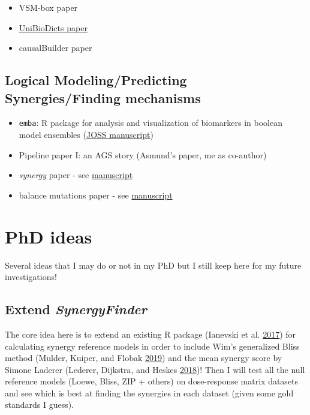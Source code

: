 \documentclass[
  12pt,
]{book}
\providecommand{\tightlist}{%
  \setlength{\itemsep}{0pt}\setlength{\parskip}{0pt}}
\begin{document}
\begin{itemize}
\tightlist
\item
  VSM-box paper
\item
  \protect\hyperlink{vsm}{UniBioDicts paper}
\item
  causalBuilder paper
\end{itemize}

\hypertarget{logical-modelingpredicting-synergiesfinding-mechanisms}{%
\section*{Logical Modeling/Predicting Synergies/Finding mechanisms}\label{logical-modelingpredicting-synergiesfinding-mechanisms}}

\begin{itemize}
\tightlist
\item
  \texttt{emba}: R package for analysis and visualization of biomarkers in boolean model ensembles (\href{http://tiny.cc/emba-joss}{JOSS manuscript})
\item
  Pipeline paper I: an AGS story (Asmund's paper, me as co-author)
\item
  \emph{synergy} paper - see \href{http://tiny.cc/synergy-paper}{manuscript}
\item
  balance mutations paper - see \href{http://tiny.cc/balance-paper}{manuscript}
\end{itemize}

\hypertarget{phd-ideas}{%
\chapter{PhD ideas}\label{phd-ideas}}

Several ideas that I may do or not in my PhD but I still keep here for my future
investigations!

\hypertarget{synergy-finder}{%
\section*{\texorpdfstring{Extend \emph{SynergyFinder}}{Extend SynergyFinder}}\label{synergy-finder}}

The core idea here is to extend an existing R package (Ianevski et al. \protect\hyperlink{ref-Ianevski2017}{2017}) for calculating synergy reference models in order to include Wim's generalized Bliss method (Mulder, Kuiper, and Flobak \protect\hyperlink{ref-Mulder2019}{2019}) and the mean synergy score by Simone Laderer (Lederer, Dijkstra, and Heskes \protect\hyperlink{ref-Lederer2018}{2018})!
Then I will test all the null reference models (Loewe, Bliss, ZIP + others) on dose-response matrix datasets and see which is best at finding the synergies in each dataset (given some gold standards I guess).
\end{document}
